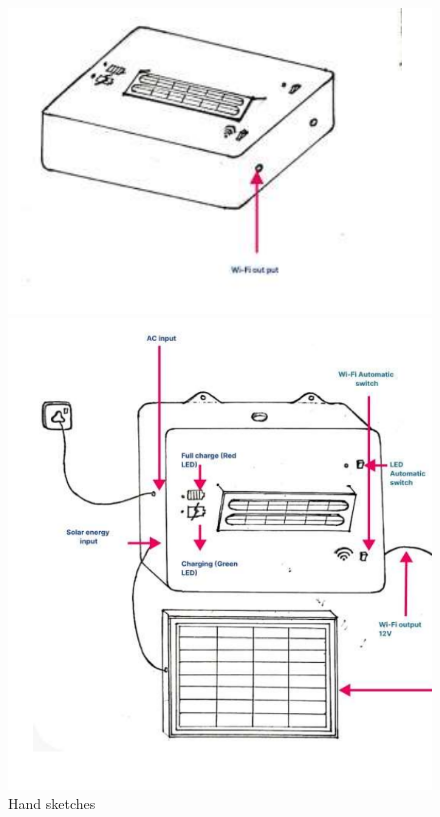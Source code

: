 \documentclass[twocolumn]{article}
\begin{document}
\begin{figure}[h]
\begin{minipage}[b]{0.2\textwidth}
\includegraphics[width=\textwidth]{12.png}
\end{minipage}
\hfill
\begin{minipage}[b]{0.2\textwidth}
\includegraphics[width=\textwidth]{13.png}
\end{minipage}
\caption{Hand sketches}
\end{figure}
\end{document}
